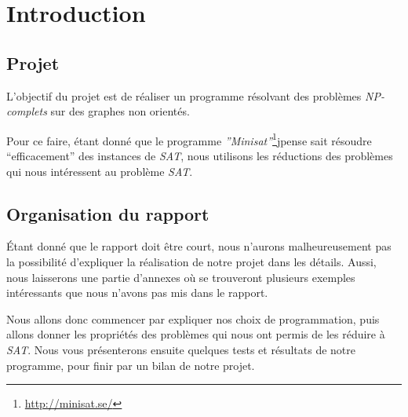  \section{Introduction}

  \subsection{Projet}
  L'objectif du projet est de réaliser un programme résolvant des
  problèmes \emph{NP-complets} sur des graphes non orientés.

  Pour ce faire, étant donné que le programme
  \emph{''Minisat''}\footnote{\url{http://minisat.se/}}jpense  sait résoudre
  ``efficacement'' des instances de \emph{SAT}, nous utilisons les
  réductions des problèmes qui nous intéressent au problème \emph{SAT}.

  \subsection{Organisation du rapport}
  Étant donné que le rapport doit être court, nous n'aurons
  malheureusement pas la possibilité d'expliquer la réalisation de notre 
  projet dans les détails. Aussi, nous laisserons une partie d'annexes
  où se trouveront plusieurs exemples intéressants que nous n'avons pas
  mis dans le rapport.

  Nous allons donc commencer par expliquer nos choix de programmation,
  puis allons donner les propriétés des problèmes qui nous ont permis de
  les réduire à \emph{SAT}. Nous vous présenterons ensuite quelques
  tests et résultats de notre programme, pour finir par un bilan de
  notre projet.
